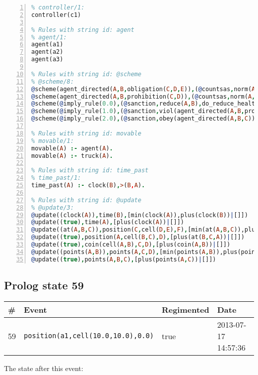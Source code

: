 \documentclass[11pt]{article}\usepackage[utf8]{inputenc}\usepackage{geometry}
\begin{document}
\begin{lstlisting}[language=Prolog, numbers=left]
% Rules with string id: controller
% controller/1:
controller(c1)

% Rules with string id: agent
% agent/1:
agent(a1)
agent(a2)
agent(a3)

% Rules with string id: @scheme
% @scheme/8:
@scheme(agent_directed(A,B,obligation(C,D,E)),(@countsas,norm(A,B,F,obligation(C,D,E)),F),false,(listTrue(C)),(time_past(D)),false,[plus(viol(agent_directed(A,B,obligation(C,D,E))))|[]],[plus(obey(agent_directed(A,B,obligation(C,D,E))))|[]])
@scheme(agent_directed(A,B,prohibition(C,D)),(@countsas,norm(A,B,E,prohibition(C,D)),E),(listTrue(C)),false,(false),false,[plus(viol(agent_directed(A,B,prohibition(C,D))))|[]],[plus(obey(agent_directed(A,B,prohibition(C,D))))|[]])
@scheme(@imply_rule(0.0),(@sanction,reduce(A,B),do_reduce_health(A,B),notifyAgent(A,changed(status))),true,false,false,false,[min(reduce(A,B))|[]],[])
@scheme(@imply_rule(1.0),(@sanction,viol(agent_directed(A,B,prohibition(C,D))),do_sanction(D)),true,false,false,false,[min(viol(agent_directed(A,B,prohibition(C,D))))|[]],[])
@scheme(@imply_rule(2.0),(@sanction,obey(agent_directed(A,B,C))),true,false,false,false,[min(obey(agent_directed(A,B,C)))|[]],[])

% Rules with string id: movable
% movable/1:
movable(A) :- agent(A).
movable(A) :- truck(A).

% Rules with string id: time_past
% time_past/1:
time_past(A) :- clock(B),>(B,A).

% Rules with string id: @update
% @update/3:
@update((clock(A)),time(B),[min(clock(A)),plus(clock(B))|[]])
@update((true),time(A),[plus(clock(A))|[]])
@update((at(A,B,C)),position(C,cell(D,E),F),[min(at(A,B,C)),plus(at(D,E,C))|[]])
@update((true),position(A,cell(B,C),D),[plus(at(B,C,A))|[]])
@update((true),coin(cell(A,B),C,D),[plus(coin(A,B))|[]])
@update((points(A,B)),points(A,C,D),[min(points(A,B)),plus(points(A,D))|[]])
@update((true),points(A,B,C),[plus(points(A,C))|[]])

\end{lstlisting}
\clearpage 
\subsection{Prolog state 59}
\begin{table}[ht]
\centering 
\begin{tabular}{l l l l} 
\textbf{\#} & \textbf{Event} & \textbf{Regimented} & \textbf{Date} \\ [0.5ex] 
\hline
59&\texttt{position(a1,cell(10.0,10.0),0.0)}&true&2013-07-17 14:57:36\\ [1ex] \hline\end{tabular}
\end{table}
The state after this event:
\end{document}
